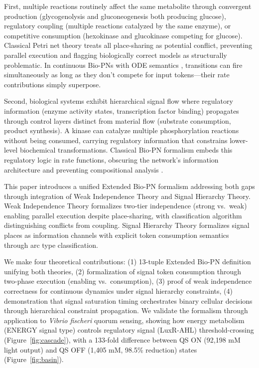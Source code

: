 \documentclass[twocolumn,11pt]{article}
\begin{document}
First, multiple reactions routinely affect the same metabolite through convergent production (glycogenolysis and gluconeogenesis both producing glucose), regulatory coupling (multiple reactions catalyzed by the same enzyme), or competitive consumption (hexokinase and glucokinase competing for glucose). Classical Petri net theory treats all place-sharing as potential conflict, preventing parallel execution and flagging biologically correct models as structurally problematic. In continuous Bio-PNs with ODE semantics \cite{Gilbert2006,Koch2011}, transitions can fire simultaneously as long as they don't compete for input tokens---their rate contributions simply superpose.

Second, biological systems exhibit hierarchical signal flow where regulatory information (enzyme activity states, transcription factor binding) propagates through control layers distinct from material flow (substrate consumption, product synthesis). A kinase can catalyze multiple phosphorylation reactions without being consumed, carrying regulatory information that constrains lower-level biochemical transformations. Classical Bio-PN formalism embeds this regulatory logic in rate functions, obscuring the network's information architecture and preventing compositional analysis \cite{Chaouiya2006}.

This paper introduces a unified Extended Bio-PN formalism addressing both gaps through integration of Weak Independence Theory and Signal Hierarchy Theory. Weak Independence Theory formalizes two-tier independence (strong vs.\ weak) enabling parallel execution despite place-sharing, with classification algorithm distinguishing conflicts from coupling. Signal Hierarchy Theory formalizes signal places as information channels with explicit token consumption semantics through arc type classification.

We make four theoretical contributions: (1) 13-tuple Extended Bio-PN definition unifying both theories, (2) formalization of signal token consumption through two-phase execution (enabling vs.\ consumption), (3) proof of weak independence correctness for continuous dynamics under signal hierarchy constraints, (4) demonstration that signal saturation timing orchestrates binary cellular decisions through hierarchical constraint propagation. We validate the formalism through application to \textit{Vibrio fischeri} quorum sensing, showing how energy metabolism (ENERGY signal type) controls regulatory signal (LuxR-AHL) threshold-crossing (Figure~\ref{fig:cascade}), with a 133-fold difference between QS ON (92,198 mM light output) and QS OFF (1,405 mM, 98.5\% reduction) states (Figure~\ref{fig:basin}).
\end{document}

